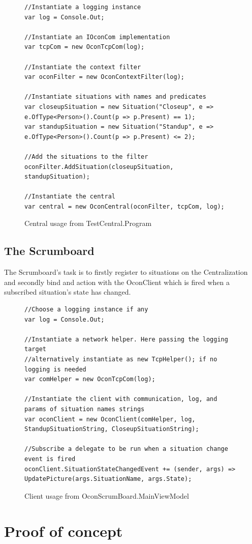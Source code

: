 \documentclass[../report.tex]{subfiles}
\begin{document}
\begin{figure}[H]
\begin{lstlisting}
//Instantiate a logging instance
var log = Console.Out;

//Instantiate an IOconCom implementation
var tcpCom = new OconTcpCom(log);

//Instantiate the context filter
var oconFilter = new OconContextFilter(log);

//Instantiate situations with names and predicates
var closeupSituation = new Situation("Closeup", e => e.OfType<Person>().Count(p => p.Present) == 1);
var standupSituation = new Situation("Standup", e => e.OfType<Person>().Count(p => p.Present) <= 2);

//Add the situations to the filter
oconFilter.AddSituation(closeupSituation, standupSituation);

//Instantiate the central
var central = new OconCentral(oconFilter, tcpCom, log);
\end{lstlisting}
\caption{Central usage from TestCentral.Program}
\label{code:OconCentral}
\end{figure}


\newpage

\subsection{The Scrumboard}

The Scrumboard's task is to firstly register to situations on the Centralization and secondly bind and action with the OconClient which is fired when a subscribed situation's state has changed.

\begin{figure}[H]
\begin{lstlisting}
//Choose a logging instance if any
var log = Console.Out;

//Instantiate a network helper. Here passing the logging target
//alternatively instantiate as new TcpHelper(); if no logging is needed
var comHelper = new OconTcpCom(log);

//Instantiate the client with communication, log, and params of situation names strings
var oconClient = new OconClient(comHelper, log, StandupSituationString, CloseupSituationString);

//Subscribe a delegate to be run when a situation change event is fired
oconClient.SituationStateChangedEvent += (sender, args) => UpdatePicture(args.SituationName, args.State);
\end{lstlisting}
\caption{Client usage from OconScrumBoard.MainViewModel}
\label{code:OconClient}
\end{figure}





\section{Proof of concept}

\end{document}

